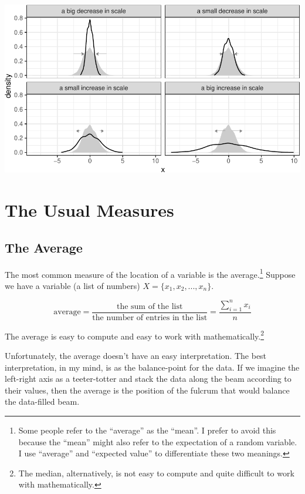 \documentclass[]{book}
\let\rmarkdownfootnote\footnote%
\def\footnote{\protect\rmarkdownfootnote}
\begin{document}
\includegraphics{concepts-and-computation_files/figure-latex/unnamed-chunk-3-1.pdf}

\hypertarget{the-usual-measures}{%
\section{The Usual Measures}\label{the-usual-measures}}

\hypertarget{the-average}{%
\subsection{The Average}\label{the-average}}

The most common measure of the location of a variable is the average.\footnote{Some people refer to the ``average'' as the ``mean''. I prefer to avoid this because the ``mean'' might also refer to the expectation of a random variable. I use ``average'' and ``expected value'' to differentiate these two meanings.} Suppose we have a variable (a list of numbers) \(X = \{x_1, x_2, ..., x_n\}\).

\begin{equation}
\text{average} = \dfrac{\text{the sum of the list}}{\text{the number of entries in the list}} = \dfrac{\sum_{i = 1}^n x_i}{n} \nonumber
\end{equation}

The average is easy to compute and easy to work with mathematically.\footnote{The median, alternatively, is not easy to compute and quite difficult to work with mathematically.}

Unfortunately, the average doesn't have an easy interpretation. The best interpretation, in my mind, is as the balance-point for the data. If we imagine the left-right axis as a teeter-totter and stack the data along the beam according to their values, then the average is the position of the fulcrum that would balance the data-filled beam.
\end{document}
